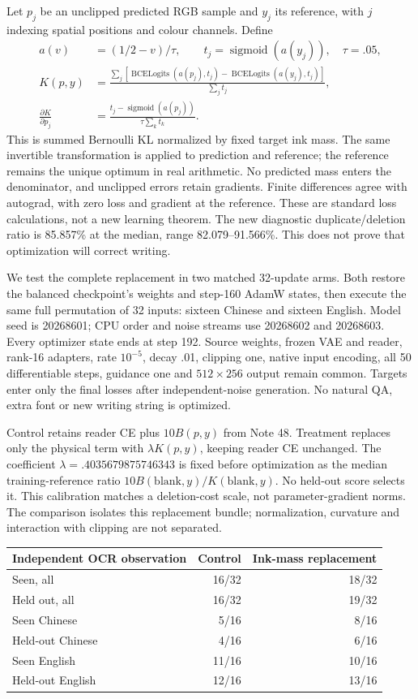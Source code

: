 \documentclass[10pt,a4paper]{article}
\begin{document}
Let $p_j$ be an unclipped predicted RGB sample and $y_j$ its reference, with
$j$ indexing spatial positions and colour channels. Define
\begin{align}
 a(v)&=(1/2-v)/\tau,\qquad t_j=\operatorname{sigmoid}(a(y_j)),\quad \tau=.05,\\
 K(p,y)&=\frac{\sum_j\left[
 \operatorname{BCELogits}(a(p_j),t_j)
 -\operatorname{BCELogits}(a(y_j),t_j)\right]}{\sum_j t_j},\\
 \frac{\partial K}{\partial p_j}
 &=\frac{t_j-\operatorname{sigmoid}(a(p_j))}{\tau\sum_k t_k}.
\end{align}
This is summed Bernoulli KL normalized by fixed target ink mass. The same
invertible transformation is applied to prediction and reference; the
reference remains the unique optimum in real arithmetic. No predicted mass
enters the denominator, and unclipped errors retain gradients. Finite differences
agree with autograd, with zero loss and gradient at the reference. These are
standard loss calculations, not a new learning theorem. The new diagnostic
duplicate/deletion ratio is 85.857\% at the median, range 82.079--91.566\%.
This does not prove that optimization will correct writing.

We test the complete replacement in two matched 32-update arms. Both restore
the balanced checkpoint's weights and step-160 AdamW states, then execute the
same full permutation of 32 inputs: sixteen Chinese and sixteen English.
Model seed is 20268601; CPU order and noise streams use 20268602 and 20268603.
Every optimizer state ends at step 192. Source weights, frozen VAE and reader,
rank-16 adapters, rate $10^{-5}$, decay .01, clipping one, native input encoding,
all 50 differentiable steps, guidance one and $512\times256$ output remain
common. Targets enter only the final losses after independent-noise generation.
No natural QA, extra font or new writing string is optimized.

Control retains reader CE plus $10B(p,y)$ from Note 48. Treatment replaces only
the physical term with $\lambda K(p,y)$, keeping reader CE unchanged.
The coefficient $\lambda=.4035679875746343$ is fixed before optimization as the
median training-reference ratio $10B(\mathrm{blank},y)/K(\mathrm{blank},y)$.
No held-out score selects it. This calibration matches a deletion-cost scale,
not parameter-gradient norms. The comparison isolates this replacement bundle;
normalization, curvature and interaction with clipping are not separated.

\begin{center}\small
\begin{tabular}{lrr}
\toprule
Independent OCR observation & Control & Ink-mass replacement\\
\midrule
Seen, all & 16/32 & 18/32\\
Held out, all & 16/32 & 19/32\\
Seen Chinese & 5/16 & 8/16\\
Held-out Chinese & 4/16 & 6/16\\
Seen English & 11/16 & 10/16\\
Held-out English & 12/16 & 13/16\\
\bottomrule
\end{tabular}
\end{center}
\end{document}
